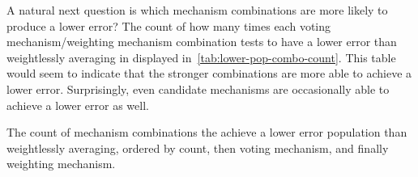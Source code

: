 A natural next question is which mechanism combinations are more likely to produce a
lower error?
The count of how many times each voting mechanism/weighting mechanism combination
tests to have a lower error than weightlessly averaging in displayed
in~\autoref{tab:lower-pop-combo-count}.
This table would seem to indicate that the stronger combinations are more able to
achieve a lower error.
Surprisingly, even candidate mechanisms are occasionally able to achieve a lower error
as well.

\begin{table}[htbp]
    \renewcommand{\arraystretch}{1.0}

    \caption{The count of mechanism combinations the achieve a lower error
    population than weightlessly averaging, ordered by count, then voting mechanism,
        and finally weighting mechanism.}
    \label{tab:lower-pop-combo-count}


\end{table}
